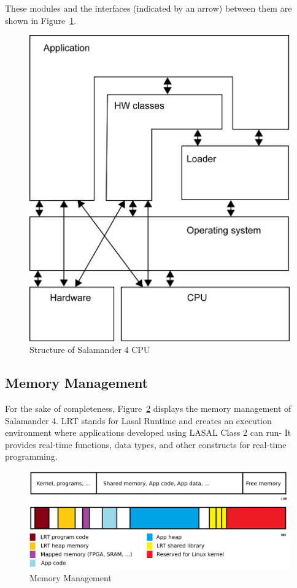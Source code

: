\documentclass[MMR,Master,english]{twbook}
\begin{document}
\clearpage

\noindent These modules and the interfaces (indicated by an arrow) between them are shown in Figure~\ref{fig:lasal_cpu}.

\begin{figure}[H]
	\centering
	\includegraphics[width=0.5\columnwidth]{img/Software-Struktur_einer_LASAL_CPU.png}
	\caption[Structure of Salamander 4 CPU]{Structure of Salamander 4 CPU}
	\label{fig:lasal_cpu}
\end{figure}

\subsection{Memory Management}
\noindent For the sake of completeness, Figure~\ref{fig:memory_management} displays the memory management of Salamander 4. LRT stands for Lasal Runtime and creates an execution environment where applications developed using LASAL Class 2 can run- It provides real-time functions, data types, and other constructs for real-time programming.

\begin{figure}[H]
	\centering
	\includegraphics[width=0.8\columnwidth]{img/RAM_Memory_management.png}
	\caption[Memory Management]{Memory Management}
	\label{fig:memory_management}
\end{figure}
\end{document}
